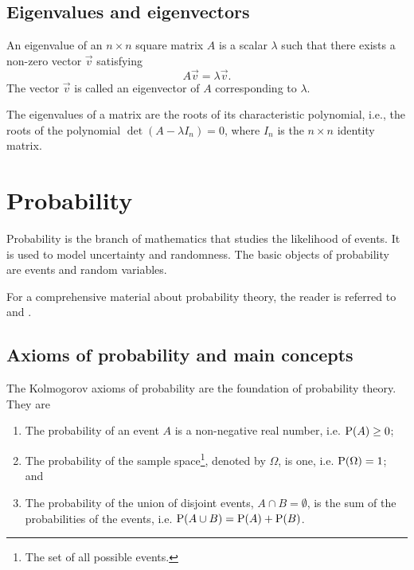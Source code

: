\subsection{Eigenvalues and eigenvectors}

An eigenvalue of an $n \times n$ square matrix $A$ is a scalar $\lambda$ such that there exists a
non-zero vector $\vec{v}$ satisfying
\begin{equation}
  \label{eq:eig}
  A \vec{v} = \lambda \vec{v}\text{.}
\end{equation}
The vector $\vec{v}$ is called an eigenvector of $A$ corresponding to $\lambda$.

The eigenvalues of a matrix are the roots of its characteristic polynomial, i.e., the
roots of the polynomial $\det(A - \lambda I_n) = 0$, where $I_n$ is the $n \times n$ identity matrix.

\section{Probability}

Probability is the branch of mathematics that studies the likelihood of events.  It is
used to model uncertainty and randomness.  The basic objects of probability are events
and random variables.

For a comprehensive material about probability theory, the reader is referred to
\textcite{Ross2019} and \textcite{Ross2023}.

\subsection{Axioms of probability and main concepts}

The Kolmogorov axioms of probability are the foundation of probability theory.
They are
\begin{enumerate}
  \item The probability of an event $A$ is a non-negative real number, i.e. $\operatorname{P}(A) \geq 0$;
  \item The probability of the sample space\footnote{The set of all possible
    events.}, denoted by $\Omega$, is one, i.e. $\operatorname{P}(\Omega) = 1$; and
  \item The probability of the union of disjoint events, $A \cap B = \emptyset$, is
    the sum of the probabilities of the events, i.e. $\operatorname{P}(A \cup B) = \operatorname{P}(A) + \operatorname{P}(B)$.
\end{enumerate}

